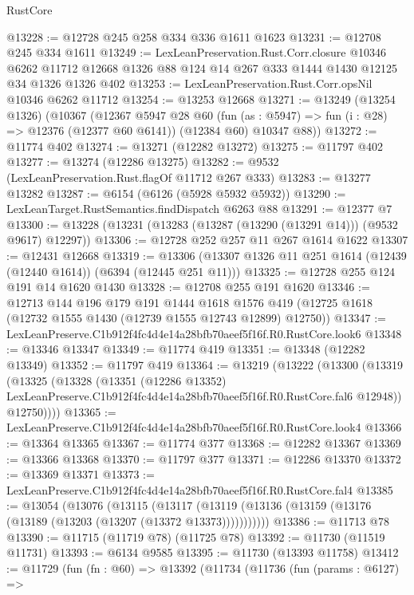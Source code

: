 \begin{lexlean}{RustCore}
\begin{coremodule}
@13228 := @12728 @245 @258 @334 @336 @1611 @1623
@13231 := @12708 @245 @334 @1611
@13249 := LexLeanPreservation.Rust.Corr.closure
    @10346
    @6262
    @11712
    @12668
    @1326
    @88
    @124
    @14
    @267
    @333
    @1444
    @1430
    @12125
    @34
    @1326
    @1326
    @402
@13253 := LexLeanPreservation.Rust.Corr.opsNil @10346 @6262 @11712
@13254 := @13253 @12668
@13271 := @13249
    (@13254 @1326)
    (@10367
      (@12367
        @5947
        @28
        @60
        (fun (as : @5947) => fun (i : @28) => @12376 (@12377 @60 @6141))
        (@12384 @60)
        @10347
        @88))
@13272 := @11774 @402
@13274 := @13271 (@12282 @13272)
@13275 := @11797 @402
@13277 := @13274 (@12286 @13275)
@13282 := @9532 (LexLeanPreservation.Rust.flagOf @11712 @267 @333)
@13283 := @13277 @13282
@13287 := @6154 (@6126 (@5928 @5932 @5932))
@13290 := LexLeanTarget.RustSemantics.findDispatch @6263 @88
@13291 := @12377 @7
@13300 := @13228 (@13231 (@13283 (@13287 (@13290 (@13291 @14))) (@9532 @9617) @12297))
@13306 := @12728 @252 @257 @11 @267 @1614 @1622
@13307 := @12431 @12668
@13319 := @13306 (@13307 @1326 @11 @251 @1614 (@12439 (@12440 @1614)) (@6394 (@12445 @251 @11)))
@13325 := @12728 @255 @124 @191 @14 @1620 @1430
@13328 := @12708 @255 @191 @1620
@13346 := @12713
    @144
    @196
    @179
    @191
    @1444
    @1618
    @1576
    @419
    (@12725 @1618 (@12732 @1555 @1430 (@12739 @1555 @12743 @12899) @12750))
@13347 := LexLeanPreserve.C1b912f4fc4d4e14a28bfb70aeef5f16f.R0.RustCore.look6
@13348 := @13346 @13347
@13349 := @11774 @419
@13351 := @13348 (@12282 @13349)
@13352 := @11797 @419
@13364 := @13219
    (@13222
      (@13300
        (@13319
          (@13325
            (@13328
              (@13351
                (@12286 @13352)
                LexLeanPreserve.C1b912f4fc4d4e14a28bfb70aeef5f16f.R0.RustCore.fal6
                @12948))
            @12750))))
@13365 := LexLeanPreserve.C1b912f4fc4d4e14a28bfb70aeef5f16f.R0.RustCore.look4
@13366 := @13364 @13365
@13367 := @11774 @377
@13368 := @12282 @13367
@13369 := @13366 @13368
@13370 := @11797 @377
@13371 := @12286 @13370
@13372 := @13369 @13371
@13373 := LexLeanPreserve.C1b912f4fc4d4e14a28bfb70aeef5f16f.R0.RustCore.fal4
@13385 := @13054
    (@13076
      (@13115
        (@13117 (@13119 (@13136 (@13159 (@13176 (@13189 (@13203 (@13207 (@13372 @13373)))))))))))
@13386 := @11713 @78
@13390 := @11715 (@11719 @78) (@11725 @78)
@13392 := @11730 (@11519 @11731)
@13393 := @6134 @9585
@13395 := @11730 (@13393 @11758)
@13412 := @11729
    (fun (fn : @60) =>
    @13392
      (@11734
        (@11736
          (fun (params : @6127) =>

\end{coremodule}
\end{lexlean}
